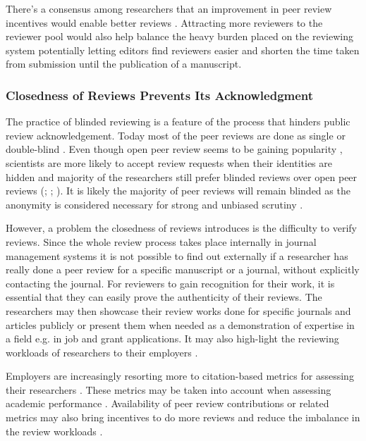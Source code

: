 There’s a consensus among researchers that an improvement in peer review incentives would enable better reviews \parencite{Publons.2018}. Attracting more reviewers to the reviewer pool would also help balance the heavy burden placed on the reviewing system potentially letting editors find reviewers easier and shorten the time taken from submission until the publication of a manuscript. 

\subsubsection{Closedness of Reviews Prevents Its Acknowledgment}

The practice of blinded reviewing is a feature of the process that hinders public review acknowledgement. Today most of the peer reviews are done as single or double-blind \parencite{Wolfram.2020}. Even though open peer review seems to be gaining popularity \parencite{Wolfram.2020}, scientists are more likely to accept review requests when their identities are hidden \parencite{vanRooyen.1999} and majority of the researchers still prefer blinded reviews over open peer reviews (\cite[149]{Mulligan.2013}; \cite{Taylor&Francis.2015}; \cite[1038-1039]{Wolfram.2020}). It is likely the majority of peer reviews will remain blinded as the anonymity is considered necessary for strong and unbiased scrutiny \parencite[21-23]{RossHellauer.2017}.

However, a problem the closedness of reviews introduces is the difficulty to verify reviews. Since the whole review process takes place internally in journal management systems it is not possible to find out externally if a researcher has really done a peer review for a specific manuscript or a journal, without explicitly contacting the journal. For reviewers to gain recognition for their work, it is essential that they can easily prove the authenticity of their reviews. The researchers may then showcase their review works done for specific journals and articles publicly or present them when needed as a demonstration of expertise in a field e.g. in job and grant applications. It may also high-light the reviewing workloads of researchers to their employers \parencite[2]{Raoult.2020}. 

Employers are increasingly resorting more to citation-based metrics for assessing their researchers \parencite{Bianchi.2019, Cantor.2015, Kachewar.2013, Verissimo.2013}. These metrics may be taken into account when assessing academic performance \parencite[11]{Ferreira.2016}. Availability of peer review contributions or related metrics may also bring incentives to do more reviews and reduce the imbalance in the review workloads \parencite[4]{Petchey.2014}. 

